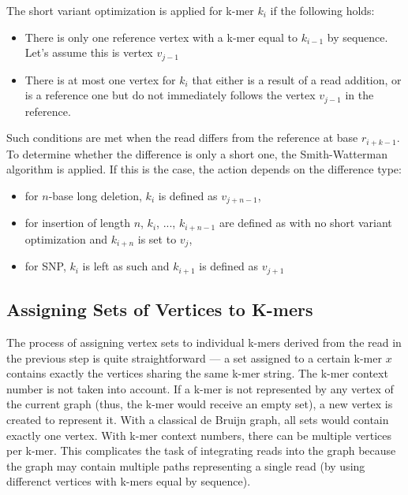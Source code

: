 The short variant optimization is applied for k-mer $k_i$ if the following holds:
\begin{itemize}
\item There is only one reference vertex with a k-mer equal to $k_{i-1}$ by sequence. Let's assume this is vertex $v_{j-1}$
\item There is at most one vertex for $k_i$ that either is a result of a read addition, or is a reference one but do not immediately follows  the vertex $v_{j-1}$ in the reference.
\end{itemize}
Such conditions are met when the read differs from the reference at base $r_{i+k-1}$. To determine whether the difference is only a short one, the Smith-Watterman algorithm is applied. If this is the case, the action depends on the difference type:
\begin{itemize}
\item for $n$-base long deletion, $k_i$ is defined as $v_{j + n - 1}$,
\item for insertion of length $n$, $k_i$, ..., $k_{i + n - 1}$ are defined as with no short variant optimization and $k_{i + n}$ is set to $v_j$,
\item for SNP, $k_i$ is left as such and $k_{i+1}$ is defined as $v_{j+1}$
\end{itemize}

\subsection{Assigning Sets of Vertices to K-mers}
\label{subsec:assign-sets}

The process of assigning vertex sets to individual k-mers derived from the read in the previous step is quite straightforward --- a set assigned to a certain k-mer $x$ contains exactly the vertices sharing the same k-mer string. The k-mer context number is not taken into account. If a k-mer is not represented by any vertex of the current graph (thus, the k-mer would receive an empty set), a new vertex is created to represent it. With a classical de Bruijn graph, all sets would contain exactly one vertex. With k-mer context numbers, there can be multiple vertices per k-mer. This complicates the task of integrating reads into the graph because the graph may contain multiple paths representing a single read (by using differenct vertices with k-mers equal by sequence).

